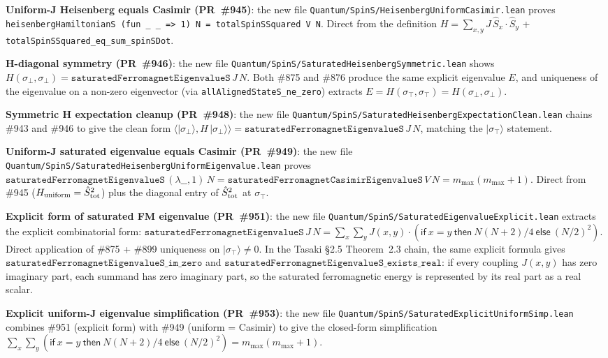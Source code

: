 \documentclass[a4paper,11pt]{article}
\begin{document}
\textbf{Uniform-J Heisenberg equals Casimir (PR~\#945)}: the new
file \texttt{Quantum/SpinS/HeisenbergUniformCasimir.lean} proves
\texttt{heisenbergHamiltonianS (fun \_ \_ => 1) N = totalSpinSSquared V N}.
Direct from the definition $H = \sum_{x, y} J\,\hat{S}_x\cdot\hat{S}_y$
+ \texttt{totalSpinSSquared\_eq\_sum\_spinSDot}.

\textbf{H-diagonal symmetry (PR~\#946)}: the new file
\texttt{Quantum/SpinS/SaturatedHeisenbergSymmetric.lean} shows
$H(\sigma_\bot, \sigma_\bot) =
\texttt{saturatedFerromagnetEigenvalueS}\,J\,N$. Both \#875 and
\#876 produce the same explicit eigenvalue $E$, and uniqueness of
the eigenvalue on a non-zero eigenvector (via
\texttt{allAlignedStateS\_ne\_zero}) extracts
$E = H(\sigma_\top, \sigma_\top) = H(\sigma_\bot, \sigma_\bot)$.

\textbf{Symmetric H expectation cleanup (PR~\#948)}: the new file
\texttt{Quantum/SpinS/SaturatedHeisenbergExpectationClean.lean}
chains \#943 and \#946 to give the clean form
$\langle|\sigma_\bot\rangle, H\,|\sigma_\bot\rangle\rangle =
\texttt{saturatedFerromagnetEigenvalueS}\,J\,N$, matching the
$|\sigma_\top\rangle$ statement.

\textbf{Uniform-J saturated eigenvalue equals Casimir (PR~\#949)}:
the new file
\texttt{Quantum/SpinS/SaturatedHeisenbergUniformEigenvalue.lean}
proves
$\texttt{saturatedFerromagnetEigenvalueS}\,(\lambda\_\_, 1)\,N =
\texttt{saturatedFerromagnetCasimirEigenvalueS}\,V\,N =
m_{\max}(m_{\max}+1)$. Direct from \#945 ($H_{\rm uniform} =
\hat{S}_{\rm tot}^2$) plus the diagonal entry of $\hat{S}_{\rm tot}^2$
at $\sigma_\top$.

\textbf{Explicit form of saturated FM eigenvalue (PR~\#951)}: the
new file
\texttt{Quantum/SpinS/SaturatedEigenvalueExplicit.lean} extracts
the explicit combinatorial form:
$\texttt{saturatedFerromagnetEigenvalueS}\,J\,N = \sum_x \sum_y
J(x,y) \cdot
(\textsf{if}\ x=y\ \textsf{then}\ N(N+2)/4\ \textsf{else}\ (N/2)^2)$.
Direct application of \#875 + \#899 uniqueness on $|\sigma_\top\rangle \neq 0$.
In the Tasaki §2.5 Theorem~2.3 chain, the same explicit formula gives
\(\texttt{saturatedFerromagnetEigenvalueS\_im\_zero}\) and
\(\texttt{saturatedFerromagnetEigenvalueS\_exists\_real}\): if every coupling
\(J(x,y)\) has zero imaginary part, each summand has zero imaginary part, so
the saturated ferromagnetic energy is represented by its real part as a real
scalar.

\textbf{Explicit uniform-J eigenvalue simplification (PR~\#953)}:
the new file
\texttt{Quantum/SpinS/SaturatedExplicitUniformSimp.lean} combines
\#951 (explicit form) with \#949 (uniform = Casimir) to give
the closed-form simplification
$\sum_x \sum_y (\textsf{if}\ x=y\ \textsf{then}\ N(N+2)/4\
\textsf{else}\ (N/2)^2) = m_{\max}(m_{\max}+1)$.
\end{document}
